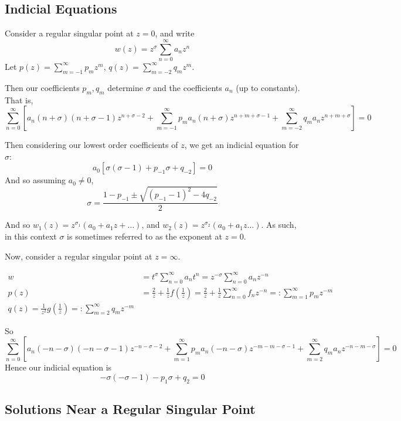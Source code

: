 \documentclass[a4paper]{article}
\begin{document}
\subsection{Indicial Equations}

Consider a regular singular point at $z=0$, and write
\[
	w(z) = z^{\sigma} \sum_{n=0}^{\infty} a_n z^{n} \tag{2}
\]
Let $p(z) = \sum_{m=-1}^{\infty} p_m z^{m}$, $q(z) = \sum_{m=-2}^{\infty} q_m z^{m}$.

Then our coefficients $p_m, q_m$ determine $\sigma$ and the coefficients $a_n$ (up to constants).
That is,
\[
\sum_{n=0}^{\infty} \left[a_n (n+\sigma)(n+\sigma - 1) z^{n+\sigma -2} + \sum_{m=-1}^{\infty} p_m a_n(n+\sigma) z^{n+m+\sigma - 1} + \sum_{m=-2}^{\infty} q_m a_n z^{n+m+\sigma}\right] = 0
\] 

Then considering our lowest order coefficients of $z$, we get an indicial equation for $\sigma$:
 \[
	 a_0 \left[ \sigma(\sigma-1) + p_{-1}\sigma + q_{-2} \right] = 0
\]
And so assuming $a_0\neq 0$,
\[
	\sigma  =\frac{1 - p_{-1} \pm \sqrt{\left( p_{-1} -1 \right)^2 - 4q_{-2}} }{2}
\] 

And so $w_1(z) = z^{\sigma_1}(a_0 + a_1z + \ldots)$, and $w_2(z) = z^{\sigma_2}(a_0 + a_1z  \ldots) $. As such, in this context $\sigma$ is sometimes referred to as the exponent at $z=0$.

Now, consider a regular singular point at  $z=\infty$.

\begin{align*}
	w &= t^{\sigma} \sum_{n=0}^{\infty}a_n t^{n} = z^{-\sigma} \sum_{n=0}^{\infty} a_n z^{-n} \\
	p(z) &= \frac{2}{z} + \frac{1}{z}f\left(\frac{1}{z}\right)  =\frac{2}{z} + \frac{1}{z} \sum_{n=0}^{\infty} f_n z^{-n} =: \sum_{m=1}^{\infty}p_m z^{-m}\\
	q(z) = \frac{1}{z^2} g\left( \frac{1}{z} \right) =: \sum_{m=2}^{\infty}q_m z^{-m}
\end{align*}

So
\[
	\sum_{n=0}^{\infty} \left[ a_n(-n-\sigma)(-n - \sigma - 1)z^{-n-\sigma-2} + \sum_{m=1}^{\infty} p_m a_n (-n-\sigma)z^{-m-m-\sigma-1} + \sum_{m=2}^{\infty} q_m a_n z^{-n-m-\sigma}\right] =0
\] 
Hence our indicial equation is
\[
	-\sigma(-\sigma-1) - p_1\sigma + q_2 = 0
\] 

\subsection{Solutions Near a Regular Singular Point}
\end{document}
